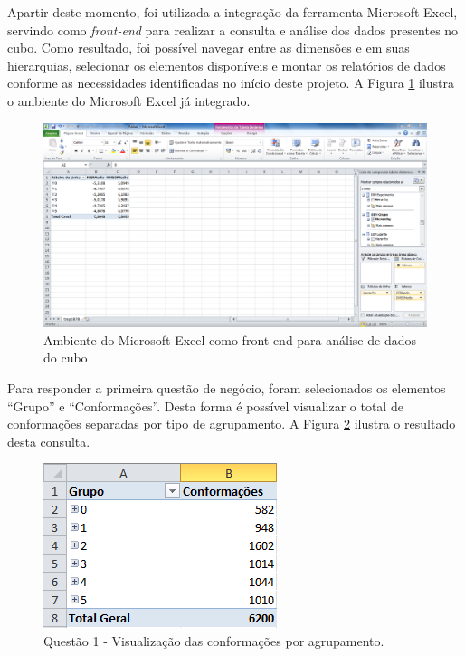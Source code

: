 Apartir deste momento, foi utilizada a integração da ferramenta Microsoft Excel, servindo como \emph{front-end} para realizar a consulta e análise dos dados presentes no cubo. Como resultado, foi possível navegar entre as dimensões e em suas hierarquias, selecionar os elementos disponíveis e montar os relatórios de dados conforme as necessidades identificadas no início deste projeto. A Figura \ref{fig:excelFull} ilustra o ambiente do Microsoft Excel já integrado.

\begin{figure}[h]
        \center
        \includegraphics[scale=0.65]{images/ExcelFull.PNG}
        \caption{Ambiente do Microsoft Excel como front-end para análise de dados do cubo}
        \label{fig:excelFull}
\end{figure}

Para responder a primeira questão de negócio, foram selecionados os elementos ``Grupo'' e ``Conformações''. Desta forma é possível visualizar o total de conformações separadas por tipo de agrupamento. A Figura \ref{fig:questao1} ilustra o resultado desta consulta.

\begin{figure}[h]
        \center
        \includegraphics[scale=1]{images/Questao1.PNG}
        \caption{Questão 1 - Visualização das conformações por agrupamento.}
        \label{fig:questao1}
\end{figure}

